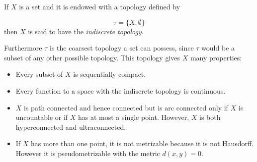 \documentclass[12pt]{article}
\begin{document}
If $X$ is a set and it is endowed with a topology defined by


$$\tau=\{X,\emptyset\} \label{eq12}$$
then $X$ is said to have the \emph{indiscrete topology}. 

 Furthermore $\tau$ is the coarsest topology a set can possess, since $\tau$
would be a subset of any other possible topology. This topology
gives $X$ many properties:
\begin{itemize}
\item Every subset of $X$ is sequentially compact.  
\item Every function to a space with the indiscrete topology is continuous.
\item $X$ is path connected and hence connected but is arc connected only if $X$ is uncountable or if $X$ has at most a single point. However, $X$ is both hyperconnected and ultraconnected. 
\item If $X$ has more than one point, it is not metrizable because it is not Hausdorff. However it is pseudometrizable with the metric $d(x,y)=0$.
\end{itemize}
\end{document}
